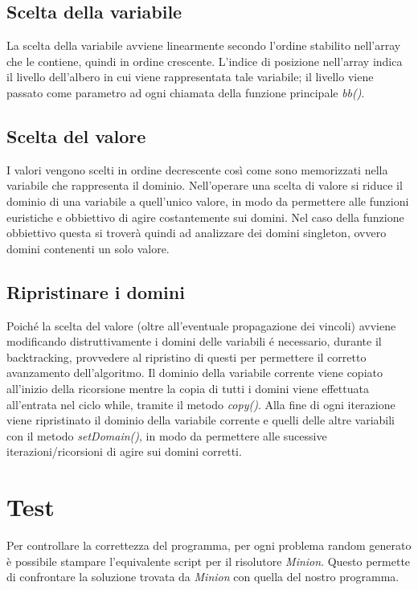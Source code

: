 \documentclass[a4paper,12pt,italian]{article}
\begin{document}
\subsection{Scelta della variabile}

La scelta della variabile avviene linearmente secondo l'ordine
stabilito nell'array che le contiene, quindi in ordine crescente. 
L'indice di posizione nell'array indica il livello dell'albero in cui viene
rappresentata tale
variabile; il livello viene passato come parametro ad ogni chiamata della
funzione principale \textit{bb()}.

\subsection{Scelta del valore}

I valori vengono scelti in ordine decrescente cos\`i come sono memorizzati
nella variabile che rappresenta il dominio. Nell'operare una scelta di valore
si riduce il dominio di una variabile a quell'unico valore, in modo da
permettere
alle funzioni euristiche e obbiettivo di agire costantemente sui domini.
Nel caso della funzione obbiettivo questa si trover\`a quindi ad analizzare
dei domini singleton, ovvero domini contenenti un solo valore.

\subsection{Ripristinare i domini}

Poich\'e la scelta del valore (oltre all'eventuale propagazione dei
vincoli) avviene modificando distruttivamente i domini delle variabili
\'e necessario, durante il backtracking, provvedere al ripristino di
questi per permettere il corretto avanzamento dell'algoritmo.  Il
dominio della variabile corrente viene copiato all'inizio della
ricorsione mentre la copia di tutti i domini viene effettuata
all'entrata nel ciclo while, tramite il metodo \textit{copy()}.  Alla
fine di ogni iterazione viene ripristinato il dominio della variabile
corrente e quelli delle altre variabili con il metodo
\textit{setDomain()}, in modo da permettere alle sucessive
iterazioni/ricorsioni di agire sui domini corretti.

\section{Test}

Per controllare la correttezza del programma, per ogni problema random
generato \`e possibile stampare l'equivalente script per il risolutore
\textit{Minion}. Questo permette di confrontare la soluzione trovata
da \textit{Minion} con quella del nostro programma.
\end{document}
